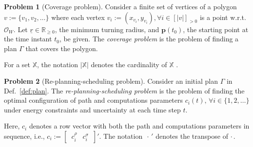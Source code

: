 \documentclass[letterpaper,10pt,journal,twoside]{IEEEtran}
\theoremstyle{definition}
\newtheorem{pb}{Problem}[section]
\begin{document}
\begin{pb}[Coverage problem]
  \label{pb:cov-pb}
  Consider a finite set of vertices of a polygon $v:=\{v_1,v_2,\dots\}$ where each vertex $v_i:=(x_{v_i},y_{v_i}),\forall i\in[|v|]_{>0}$
  is a point w.r.t. $\mathcal{O}_W$. Let $\underline{r}\in\mathbb{R}_{\geq 0}$, the minimum turning radius, and $\mathbf{p}(t_0)$, the starting point at the time instant $t_0$, be given. The \emph{coverage problem} is the problem of finding a plan $\Gamma$ that covers the polygon.
\end{pb}    

For a set $\mathbb{X}$, the notation $|\mathbb{X}|$ denotes the cardinality of $\mathbb{X}$%
.

\begin{pb}[Re-planning-scheduling problem]
  \label{pb}
  Consider an initial plan $\Gamma$ in Def.~\ref{def:plan}. The \emph{re-planning-scheduling problem} is the problem of finding the optimal configuration of path and computations parameters $c_i(t),\,\forall i\in\{1,2,\dots\}$ under energy constraints and uncertainty at each time step $t$.
\end{pb}

Here, $c_i$ denotes a row vector with both the path and computations parameters in sequence, i.e., $c_i:=[\begin{matrix}\,c_i^\rho & c_i^\sigma\,\end{matrix}]'$. The notation $\,\cdot\,'$ denotes the transpose of $\cdot\,$.



\end{document}
